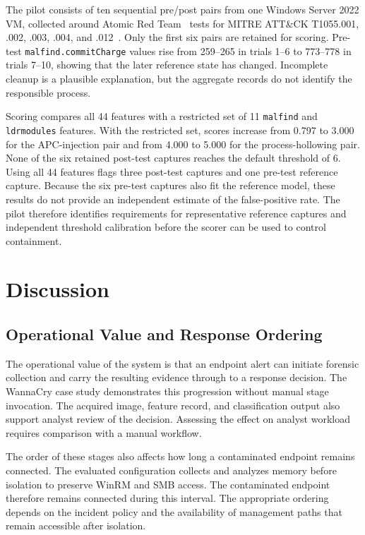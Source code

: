 \documentclass[conference]{IEEEtran}
\begin{document}
The pilot consists of ten sequential pre/post pairs from one Windows Server
2022 VM, collected around Atomic Red Team~\cite{atomicredteam} tests for
MITRE ATT\&CK T1055.001, .002, .003, .004, and .012~\cite{mitre1055}.
Only the first six pairs are retained for scoring. Pre-test
\texttt{malfind.commitCharge} values rise from 259--265 in trials 1--6 to
773--778 in trials 7--10, showing that the later reference state has changed.
Incomplete cleanup is a plausible explanation, but the aggregate records
do not identify the responsible process.

Scoring compares all 44 features with a restricted set of 11
\texttt{malfind} and \texttt{ldrmodules} features. With the restricted set,
scores increase from 0.797 to 3.000 for the APC-injection pair and from
4.000 to 5.000 for the process-hollowing pair. None of the six retained
post-test captures reaches the default threshold of 6. Using all 44
features flags three post-test captures and one pre-test reference capture.
Because the six pre-test captures also fit the reference model, these
results do not provide an independent estimate of the false-positive rate.
The pilot therefore identifies requirements for representative reference
captures and independent threshold calibration before the scorer can be
used to control containment.

\section{Discussion}
\label{sec:discussion}

\subsection{Operational Value and Response Ordering}
The operational value of the system is that an endpoint alert can initiate forensic collection and carry the resulting evidence through to a response decision. The WannaCry case study demonstrates this progression without manual stage invocation. The acquired image, feature record, and classification output also support analyst review of the decision. Assessing the effect on analyst workload requires comparison with a manual workflow.

The order of these stages also affects how long a contaminated endpoint remains connected. The evaluated configuration collects and analyzes memory before isolation to preserve WinRM and SMB access. The contaminated endpoint therefore remains connected during this interval. The appropriate ordering depends on the incident policy and the availability of management paths that remain accessible after isolation.
\end{document}
